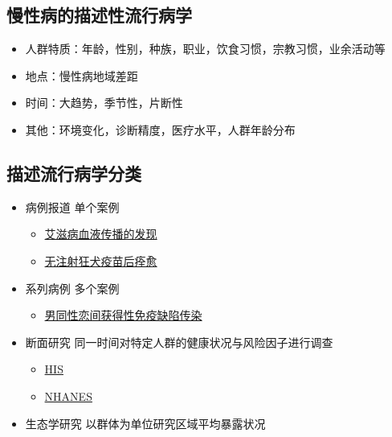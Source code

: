 \documentclass[]{book}
\providecommand{\tightlist}{%
  \setlength{\itemsep}{0pt}\setlength{\parskip}{0pt}}
\begin{document}
\subsection{慢性病的描述性流行病学}

\begin{itemize}
\tightlist
\item
  人群特质：年龄，性别，种族，职业，饮食习惯，宗教习惯，业余活动等
\item
  地点：慢性病地域差距
\item
  时间：大趋势，季节性，片断性
\item
  其他：环境变化，诊断精度，医疗水平，人群年龄分布
\end{itemize}

\subsection{描述流行病学分类}

\begin{itemize}
\tightlist
\item
  病例报道 单个案例

  \begin{itemize}
  \tightlist
  \item
    \href{http://www.thelancet.com/journals/lancet/article/PIIS0140-6736(83)92082-2/abstract\#}{艾滋病血液传播的发现}
  \item
    \href{http://www.nejm.org/doi/full/10.1056/NEJMoa050382\#t=abstract}{无注射狂犬疫苗后痊愈}
  \end{itemize}
\item
  系列病例 多个案例

  \begin{itemize}
  \tightlist
  \item
    \href{http://www.nejm.org/doi/pdf/10.1056/NEJM198112103052401}{男同性恋间获得性免疫缺陷传染}
  \end{itemize}
\item
  断面研究 同一时间对特定人群的健康状况与风险因子进行调查

  \begin{itemize}
  \tightlist
  \item
    \href{http://www.cdc.gov/nchs/nhis.htm}{HIS}
  \item
    \href{http://www.cdc.gov/nchs/nhanes.htm}{NHANES}
  \end{itemize}
\item
  生态学研究 以群体为单位研究区域平均暴露状况
\end{itemize}
\end{document}
